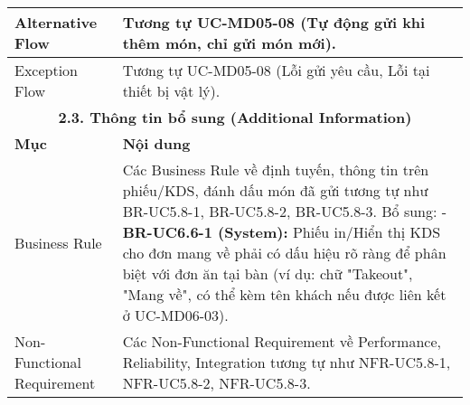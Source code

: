 \begin{longtable}{|m{4cm}|p{11cm}|}
\hline
Alternative Flow & Tương tự UC-MD05-08 (Tự động gửi khi thêm món, chỉ gửi món mới). \\
\hline
Exception Flow & Tương tự UC-MD05-08 (Lỗi gửi yêu cầu, Lỗi tại thiết bị vật lý). \\
\hline
\multicolumn{2}{|c|}{\textbf{2.3. Thông tin bổ sung (Additional Information)}} \\
\hline
\textbf{Mục} & \textbf{Nội dung} \\
\hline
Business Rule & Các Business Rule về định tuyến, thông tin trên phiếu/KDS, đánh dấu món đã gửi tương tự như BR-UC5.8-1, BR-UC5.8-2, BR-UC5.8-3. Bổ sung: \newline - \textbf{BR-UC6.6-1 (System):} Phiếu in/Hiển thị KDS cho đơn mang về phải có dấu hiệu rõ ràng để phân biệt với đơn ăn tại bàn (ví dụ: chữ "Takeout", "Mang về", có thể kèm tên khách nếu được liên kết ở UC-MD06-03). \\
\hline
Non-Functional Requirement & Các Non-Functional Requirement về Performance, Reliability, Integration tương tự như NFR-UC5.8-1, NFR-UC5.8-2, NFR-UC5.8-3. \\
\hline
\end{longtable}

